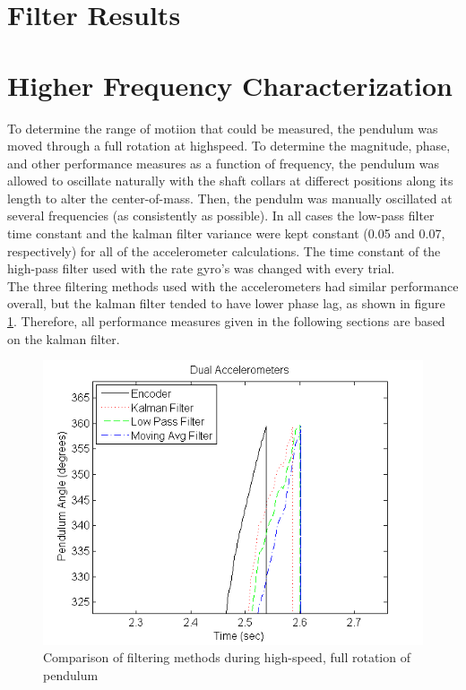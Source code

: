 \documentclass{article}
\theoremstyle{plain}
\theoremstyle{definition}
\theoremstyle{remark}
\begin{document}
\clearpage

\section{Filter Results}

\clearpage


\section{Higher Frequency Characterization}

To determine the range of motiion that could be measured, the pendulum was moved through a full rotation at highspeed. To determine the magnitude, phase, and other performance measures as a function of frequency, the pendulum was allowed to oscillate naturally with the shaft collars at differect positions along its length to alter the center-of-mass. Then, the pendulm was manually oscillated at several frequencies (as consistently as possible). In all cases the low-pass filter time constant and the kalman filter variance were kept constant (0.05 and 0.07, respectively) for all of the accelerometer calculations. The time constant of the high-pass filter used with the rate gyro's was changed with every trial.\\  

The three filtering methods used with the accelerometers had similar performance overall, but the kalman filter tended to have lower phase lag, as shown in figure \ref{kalman_lag}. Therefore, all performance measures given in the following sections are based on the kalman filter.\\

\begin{figure}[hbt]
\begin{center}
\includegraphics[width = 12cm]{Example_Kalman_Lag.png}
\caption{Comparison of filtering methods during high-speed, full rotation of pendulum}
\label{kalman_lag}
\end{center}
\end{figure}
\end{document}
